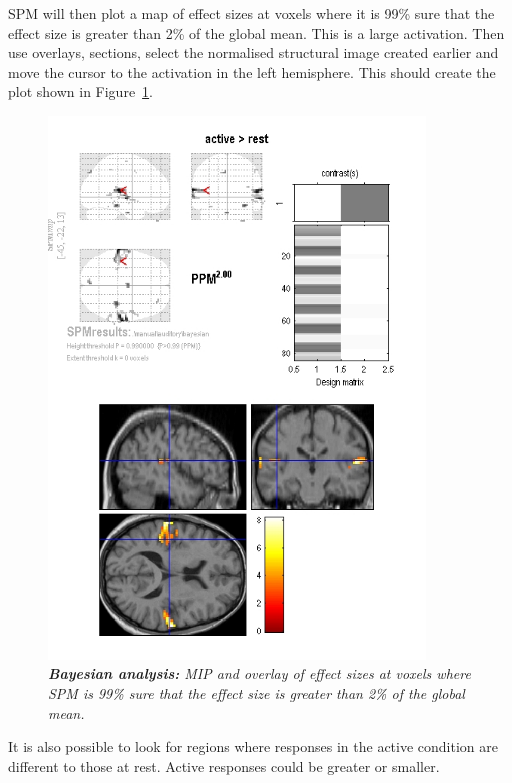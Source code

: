 SPM will then plot a map of effect sizes at voxels where it is 99\% sure that the effect size is greater than 2\% of the global mean. This is a large activation. Then use overlays, sections, select the normalised structural image created earlier and move the cursor to the activation in the left hemisphere. This should create the plot shown in Figure~\ref{aud_bayes}.

\begin{figure}
\begin{center}
\includegraphics[width=100mm]{auditory/aud_bayes}
\caption{\em \textbf{Bayesian analysis:} MIP and overlay of effect sizes at voxels where SPM is 99\% sure that the effect size is greater than 2\% of the global mean. \label{aud_bayes} }
\end{center}
\end{figure}

It is also possible to look for regions where responses in the active condition are different to those at rest. Active responses could be greater or smaller.

